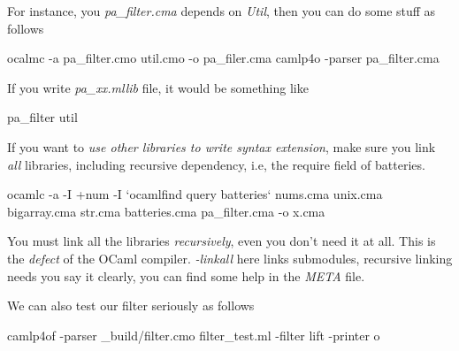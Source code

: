 For instance, you \textit{pa\_filter.cma} depends on \textit{Util}, then
you can do some stuff as follows

\begin{bashcode}
  ocalmc -a pa_filter.cmo util.cmo -o pa_filer.cma
  camlp4o -parser pa_filter.cma  
\end{bashcode}

If you write \textit{pa\_xx.mllib} file, it would be something like

\begin{bashcode}
pa_filter
util
\end{bashcode}
If you want to \textit{use other libraries to write syntax extension}, make
sure you link \textit{all} libraries, including recursive dependency,
i.e, the require field of batteries.

\begin{bashcode}
ocamlc -a  -I +num -I `ocamlfind query batteries` nums.cma unix.cma
bigarray.cma str.cma batteries.cma pa_filter.cma -o x.cma
\end{bashcode}

You must link all the libraries \textit{recursively}, even you don't
need it at all. This is the \textit{defect} of the OCaml compiler.
\textit{-linkall} here links submodules, recursive linking needs you say
it clearly, you can find some help in the \textit{META} file.

We can also test our filter seriously as follows

\begin{bashcode}
camlp4of -parser _build/filter.cmo filter_test.ml -filter lift -printer o   
\end{bashcode}

